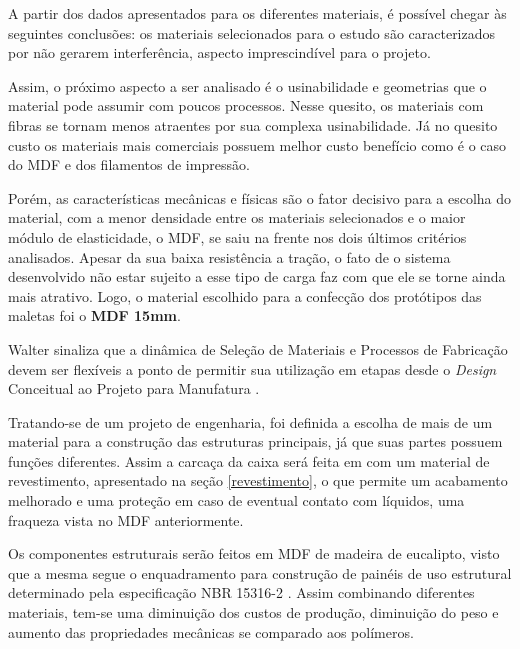 \par A partir dos dados apresentados para os diferentes materiais, é possível chegar às seguintes conclusões: os materiais selecionados para o estudo são caracterizados por não gerarem interferência, aspecto imprescindível para o projeto. 

\par Assim, o próximo aspecto a ser analisado é o usinabilidade e geometrias que o material pode assumir com poucos processos. Nesse quesito, os materiais com fibras se tornam menos atraentes por sua complexa usinabilidade. Já no quesito custo os materiais mais comerciais possuem melhor custo benefício como é o caso do MDF e dos filamentos de impressão. 

\par Porém, as características mecânicas e físicas são o fator decisivo para a escolha do material, com a menor densidade entre os materiais selecionados e o maior módulo de elasticidade, o MDF, se saiu na frente nos dois últimos critérios analisados. Apesar da sua baixa resistência a tração, o fato de o sistema desenvolvido não estar sujeito a esse tipo de carga faz com que ele se torne ainda mais atrativo. Logo, o material escolhido para a confecção dos protótipos das maletas foi o \textbf{MDF 15mm}.

\par Walter sinaliza que a dinâmica de Seleção de Materiais e Processos de Fabricação devem ser flexíveis a ponto de permitir sua utilização em etapas desde o \textit{Design} Conceitual ao Projeto para Manufatura \cite{walterconteudo}. 

\par Tratando-se de um projeto de engenharia, foi definida a escolha de mais de um material para a construção das estruturas principais, já que suas partes possuem funções diferentes. Assim a carcaça da caixa será feita em com um material de revestimento, apresentado  na seção \ref{revestimento}, o que permite um acabamento melhorado e uma proteção em caso de eventual contato com líquidos, uma fraqueza vista no MDF anteriormente. 

\par Os componentes estruturais serão feitos em MDF de madeira de eucalipto, visto que a mesma segue o enquadramento para construção de painéis de uso estrutural determinado pela especificação NBR 15316-2 \cite{propriedades_mdf}. Assim combinando diferentes materiais, tem-se uma diminuição dos custos de produção, diminuição do peso e aumento das propriedades mecânicas se comparado aos polímeros.

